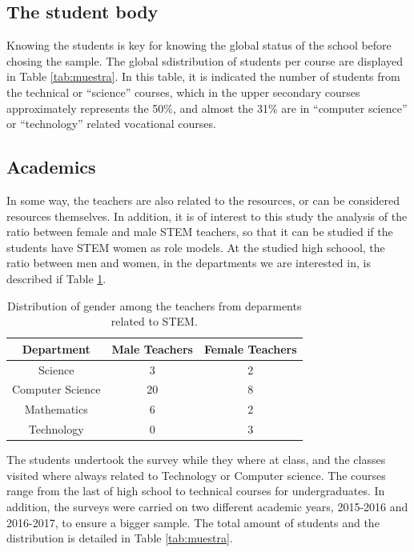 \documentclass[journal,transmag]{IEEEtran}
\begin{document}
\subsection{The student body}

Knowing the students is key for knowing the global status of the school before chosing the sample. The global sdistribution of students per course are displayed in Table \ref{tab:muestra}. In this table, it is indicated the number of students from the technical or ``science'' courses, which in the upper secondary courses approximately represents the 50\%, and almost the 31\% are in ``computer science'' or ``technology'' related vocational courses.

\subsection{Academics}

In some way, the teachers are also related to the resources, or can be considered resources themselves. In addition, it is of interest to this study the analysis of the ratio between female and male STEM teachers, so that it can be studied if the students have STEM women as role models. At the studied high schoool, the ratio between men and women, in the departments we are interested in, is described if Table \ref{tab:teachers}.

\begin{table}
	\caption[Teachers in STEM departments]{Distribution of gender among the teachers from deparments related to STEM.}
	\label{tab:teachers}
	
	\begin{center}
		\begin{tabular}{|c|c|c|}
			\hline
			\textbf{Department} & \textbf{Male Teachers} & \textbf{Female Teachers} \\ \hline
			Science & 3 & 2 \\ \hline
			Computer Science & 20 & 8 \\ \hline
			Mathematics & 6 & 2 \\ \hline
			Technology & 0 & 3 \\
			\hline
		\end{tabular}
	\end{center}
\end{table}


The students undertook the survey while they where at class, and the classes visited where always related to Technology or Computer science. The courses range from the last of high school to technical courses for undergraduates. In addition, the surveys were carried on two different academic years, 2015-2016 and 2016-2017, to ensure a bigger sample. The total amount of students and the distribution is detailed in Table \ref{tab:muestra}.
\end{document}
